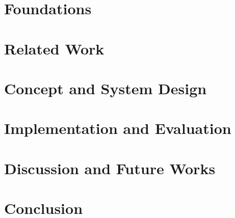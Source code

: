 \documentclass[12pt]{report}
\theoremstyle{definition}
\begin{document}
\chapter{Foundations}
\label{chap:Foundations}


\chapter{Related Work}
\label{chap:RelatedWork}


\chapter{Concept and System Design}
\label{chap:ConceptSystemDesign}


\chapter{Implementation and Evaluation}
\label{chap:ImplementationEvaluation}


\chapter{Discussion and Future Works}
\label{chap:DiscussionOutlook}


\chapter{Conclusion}
\label{chap:Conclusion}


\pagestyle{fancy}
\fancyhead[LE,RO]{\itshape \nouppercase \rightmark}
\fancyhead[LO,RE]{\itshape \nouppercase}
\fancyfoot[CE,CO]{\thepage}

\clearpage
\pagestyle{plain}
\chapter*{}
\listoffigures

\clearpage
\pagestyle{plain}
\chapter*{}
\listofalgorithms

\clearpage
\pagestyle{plain}
\chapter*{}
\listoftables


\chapter*{}

\end{document}
